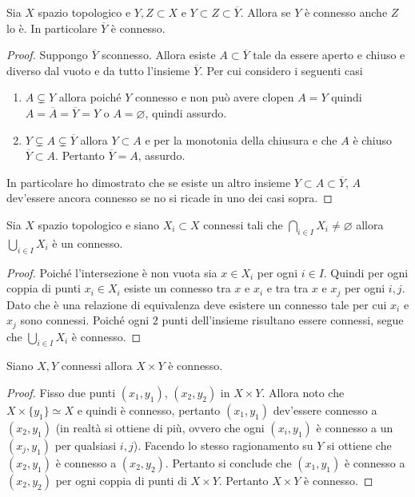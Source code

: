 \begin{theorem}
	Sia $X$ spazio topologico e $Y, Z \subset X$ e $Y \subset Z\subset \overline{Y}$. Allora se $Y$ è connesso anche $Z$ lo è. In particolare $\overline{Y}$ è connesso.
\end{theorem} 
\begin{proof}
	Suppongo $\overline{Y}$ sconnesso. Allora esiste $A \subset \overline{Y}$ tale da essere aperto e chiuso e diverso dal vuoto e da tutto l'insieme $\overline{Y}$. Per cui considero i seguenti casi
	\begin{enumerate}
		\item $A \subsetneq Y$ allora poiché $Y$ connesso e non può avere clopen $A = Y$ quindi $A = \overline{A} = \overline{Y} = Y$ o $A = \varnothing$, quindi assurdo.
		\item $Y \subsetneq A \subsetneq \overline{Y}$ allora $Y \subset A$ e per la monotonia della chiusura e che $A$ è chiuso $\overline{Y} \subset A$. Pertanto $\overline{Y}= A$, assurdo. 
	\end{enumerate}
	In particolare ho dimostrato che se esiste un altro insieme $Y \subset A \subset \overline{Y}$, $A$ dev'essere ancora connesso se no si ricade in uno dei casi sopra.
\end{proof}

\begin{theorem}
	Sia $X$ spazio topologico e siano $X_i \subset X$ connessi tali che $\bigcap_{i \in I} X_i \neq \varnothing$ allora $\bigcup_{i \in I} X_i$ è un connesso. 
\end{theorem} 
\begin{proof}
	Poiché l'intersezione è non vuota sia $x \in X_i$ per ogni $i \in I$. Quindi per ogni coppia di punti $x_i \in X_i$ esiste un connesso tra $x$ e $x_i$ e tra tra $x$ e $x_j$ per ogni $i, j$. Dato che è una relazione di equivalenza deve esistere un connesso tale per cui $x_i$ e $x_j$ sono connessi. Poiché ogni $2$ punti dell'insieme risultano essere connessi, segue che $\bigcup_{i \in I} X_i$ è connesso.
\end{proof}

\begin{theorem}
	Siano $X, Y$ connessi allora $X\times Y$ è connesso. 
\end{theorem} 
\begin{proof}
	Fisso due punti $(x_1, y_1)$, $(x_2, y_2)$ in $X \times Y$. Allora noto che $X \times \{y_1\} \simeq X$ e quindi è connesso, pertanto $(x_1, y_1)$ dev'essere connesso a $(x_2, y_1)$ (in realtà si ottiene di più, ovvero che ogni $(x_i, y_1)$ è connesso a un $(x_j, y_1)$ per qualsiasi $i,j$). Facendo lo stesso ragionamento su $Y$ si ottiene che $(x_2, y_1)$ è connesso a $(x_2, y_2)$. Pertanto si conclude che $(x_1, y_1)$ è connesso a $(x_2, y_2)$ per ogni coppia di punti di $X \times Y$. Pertanto $X \times Y$ è connesso.
\end{proof}

